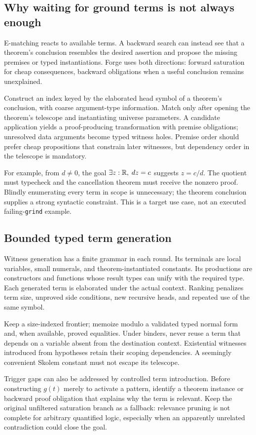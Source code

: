 \documentclass[11pt,a4paper]{article}
\newcommand{\grind}{\texttt{grind}}
\begin{document}
\subsection{Why waiting for ground terms is not always enough}
E-matching reacts to available terms. A backward search can instead see that a theorem's conclusion resembles the desired assertion and propose the missing premises or typed instantiations. Forge uses both directions: forward saturation for cheap consequences, backward obligations when a useful conclusion remains unexplained.

Construct an index keyed by the elaborated head symbol of a theorem's conclusion, with coarse argument-type information. Match only after opening the theorem's telescope and instantiating universe parameters. A candidate application yields a proof-producing transformation with premise obligations; unresolved data arguments become typed witness holes. Premise order should prefer cheap propositions that constrain later witnesses, but dependency order in the telescope is mandatory.

For example, from $d\ne0$, the goal $\exists z:\mathbb R,\;dz=c$ suggests $z=c/d$. The quotient must typecheck and the cancellation theorem must receive the nonzero proof. Blindly enumerating every term in scope is unnecessary; the theorem conclusion supplies a strong syntactic constraint. This is a target use case, not an executed failing-\grind{} example.

\subsection{Bounded typed term generation}
Witness generation has a finite grammar in each round. Its terminals are local variables, small numerals, and theorem-instantiated constants. Its productions are constructors and functions whose result types can unify with the required type. Each generated term is elaborated under the actual context. Ranking penalizes term size, unproved side conditions, new recursive heads, and repeated use of the same symbol.

Keep a size-indexed frontier; memoize modulo a validated typed normal form and, when available, proved equalities. Under binders, never reuse a term that depends on a variable absent from the destination context. Existential witnesses introduced from hypotheses retain their scoping dependencies. A seemingly convenient Skolem constant must not escape its telescope.

Trigger gaps can also be addressed by controlled term introduction. Before constructing $g(t)$ merely to activate a pattern, identify a theorem instance or backward proof obligation that explains why the term is relevant. Keep the original unfiltered saturation branch as a fallback: relevance pruning is not complete for arbitrary quantified logic, especially when an apparently unrelated contradiction could close the goal.
\end{document}
